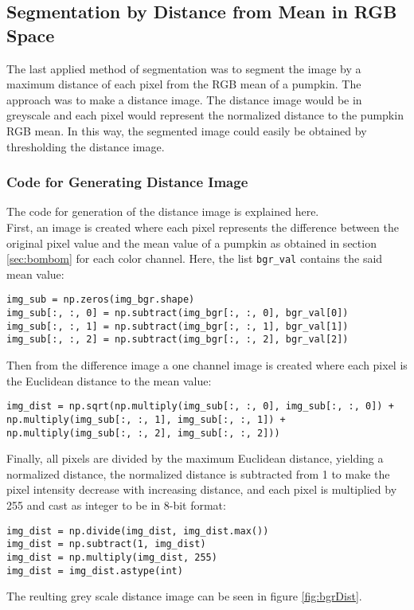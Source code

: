 \documentclass[../Head/Main.tex]{subfiles}
\begin{document}
\subsection{Segmentation by Distance from Mean in RGB Space}
The last applied method of segmentation was to segment the image by a maximum distance of each pixel from the RGB mean of a pumpkin. The approach was to make a distance image. The distance image would be in greyscale and each pixel would represent the normalized distance to the pumpkin RGB mean. In this way, the segmented image could easily be obtained by thresholding the distance image.

\subsubsection{Code for Generating Distance Image}
The code for generation of the distance image is explained here.\\
First, an image is created where each pixel represents the difference between the original pixel value and the mean value of a pumpkin as obtained in section \ref{sec:bombom} for each color channel. Here, the list \verb+bgr_val+ contains the said mean value:
\begin{verbatim}
img_sub = np.zeros(img_bgr.shape)
img_sub[:, :, 0] = np.subtract(img_bgr[:, :, 0], bgr_val[0])
img_sub[:, :, 1] = np.subtract(img_bgr[:, :, 1], bgr_val[1])
img_sub[:, :, 2] = np.subtract(img_bgr[:, :, 2], bgr_val[2])
\end{verbatim}
Then from the difference image a one channel image is created where each pixel is the Euclidean distance to the mean value:
\begin{verbatim}
img_dist = np.sqrt(np.multiply(img_sub[:, :, 0], img_sub[:, :, 0]) +
np.multiply(img_sub[:, :, 1], img_sub[:, :, 1]) + 
np.multiply(img_sub[:, :, 2], img_sub[:, :, 2]))
\end{verbatim}
Finally, all pixels are divided by the maximum Euclidean distance, yielding a normalized distance, the normalized distance is subtracted from 1 to make the pixel intensity decrease with increasing distance, and each pixel is multiplied by 255 and cast as integer to be in 8-bit format:
\begin{verbatim}
img_dist = np.divide(img_dist, img_dist.max())
img_dist = np.subtract(1, img_dist)
img_dist = np.multiply(img_dist, 255)
img_dist = img_dist.astype(int) 
\end{verbatim}
The reulting grey scale distance image can be seen in figure \ref{fig:bgrDist}.
\end{document}
